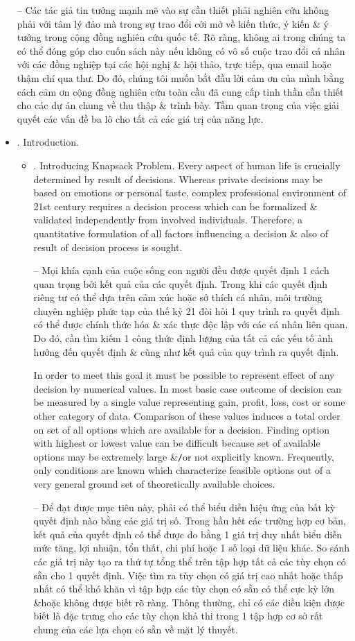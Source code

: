 \documentclass{article}
\begin{document}
\begin{itemize}
    -- Các tác giả tin tưởng mạnh mẽ vào sự cần thiết phải nghiên cứu không phải với tâm lý đảo mà trong sự trao đổi cởi mở về kiến thức, ý kiến \& ý tưởng trong cộng đồng nghiên cứu quốc tế. Rõ ràng, không ai trong chúng ta có thể đóng góp cho cuốn sách này nếu không có vô số cuộc trao đổi cá nhân với các đồng nghiệp tại các hội nghị \& hội thảo, trực tiếp, qua email hoặc thậm chí qua thư. Do đó, chúng tôi muốn bắt đầu lời cảm ơn của mình bằng cách cảm ơn cộng đồng nghiên cứu toàn cầu đã cung cấp tinh thần cần thiết cho các dự án chung về thu thập \& trình bày. Tầm quan trọng của việc giải quyết các vấn đề ba lô cho tất cả các giá trị của năng lực.
    \item {. Introduction.}
    \begin{itemize}
        \item {. Introducing Knapsack Problem.} Every aspect of human life is crucially determined by result of decisions. Whereas private decisions may be based on emotions or personal taste, complex professional environment of 21st century requires a decision process which can be formalized \& validated independently from involved individuals. Therefore, a quantitative formulation of all factors influencing a decision \& also of result of decision process is sought.

        -- Mọi khía cạnh của cuộc sống con người đều được quyết định 1 cách quan trọng bởi kết quả của các quyết định. Trong khi các quyết định riêng tư có thể dựa trên cảm xúc hoặc sở thích cá nhân, môi trường chuyên nghiệp phức tạp của thế kỷ 21 đòi hỏi 1 quy trình ra quyết định có thể được chính thức hóa \& xác thực độc lập với các cá nhân liên quan. Do đó, cần tìm kiếm 1 công thức định lượng của tất cả các yếu tố ảnh hưởng đến quyết định \& cũng như kết quả của quy trình ra quyết định.

        In order to meet this goal it must be possible to represent effect of any decision by numerical values. In most basic case outcome of decision can be measured by a single value representing gain, profit, loss, cost or some other category of data. Comparison of these values induces a total order on set of all options which are available for a decision. Finding option with highest or lowest value can be difficult because set of available options may be extremely large \&{\tt/}or not explicitly known. Frequently, only conditions are known which characterize feasible options out of a very general ground set of theoretically available choices.

        -- Để đạt được mục tiêu này, phải có thể biểu diễn hiệu ứng của bất kỳ quyết định nào bằng các giá trị số. Trong hầu hết các trường hợp cơ bản, kết quả của quyết định có thể được đo bằng 1 giá trị duy nhất biểu diễn mức tăng, lợi nhuận, tổn thất, chi phí hoặc 1 số loại dữ liệu khác. So sánh các giá trị này tạo ra thứ tự tổng thể trên tập hợp tất cả các tùy chọn có sẵn cho 1 quyết định. Việc tìm ra tùy chọn có giá trị cao nhất hoặc thấp nhất có thể khó khăn vì tập hợp các tùy chọn có sẵn có thể cực kỳ lớn \&{\tt}hoặc không được biết rõ ràng. Thông thường, chỉ có các điều kiện được biết là đặc trưng cho các tùy chọn khả thi trong 1 tập hợp cơ sở rất chung của các lựa chọn có sẵn về mặt lý thuyết.


\end{itemize}
\end{itemize}
\end{document}
